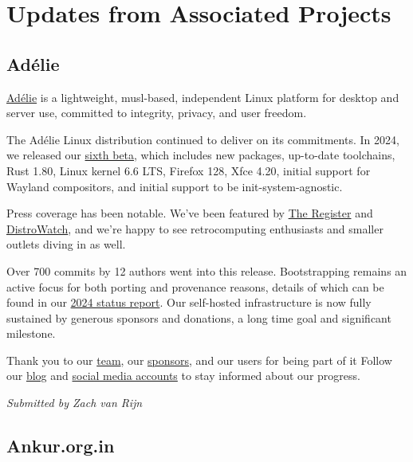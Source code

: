 \documentclass[a4paper]{report}
\begin{document}
\section{Updates from Associated Projects}

\subsection{Adélie}

\href{https://www.adelielinux.org/}{Adélie} is a lightweight, musl-based, independent Linux platform for desktop and server use, committed to integrity, privacy, and user freedom.

The Adélie Linux distribution continued to deliver on its commitments. In 2024, we released our \href{https://blog.adelielinux.org/2024/12/15/adelie-linux-1-0-beta6-released/}{sixth beta}, which includes new packages, up-to-date toolchains, Rust 1.80, Linux kernel 6.6 LTS, Firefox 128, Xfce 4.20, initial support for Wayland compositors, and initial support to be init-system-agnostic.

Press coverage has been notable. We’ve been featured by \href{https://www.theregister.com/2024/12/20/adelie_linux_1_beta_6/}{The Register} and \href{https://distrowatch.com/weekly.php?issue=20240212}{DistroWatch}, and we’re happy to see retrocomputing enthusiasts and smaller outlets diving in as well.

Over 700 commits by 12 authors went into this release. Bootstrapping remains an active focus for both porting and provenance reasons, details of which can be found in our \href{https://blog.adelielinux.org/2024/12/24/2024-state-of-the-adelie-linux-distribution/}{2024 status report}.
Our self-hosted infrastructure is now fully sustained by generous sponsors and donations, a long time goal and significant milestone.

Thank you to our \href{https://git.adelielinux.org/groups/adelie/-/group_members}{team}, our \href{https://www.adelielinux.org/sponsors/}{sponsors}, and our users for being part of it Follow our \href{https://blog.adelielinux.org/}{blog} and \href{https://www.adelielinux.org/contact/}{social media accounts} to stay informed about our progress.

{\em Submitted by Zach van Rijn} 

\subsection{Ankur.org.in}
\end{document}
